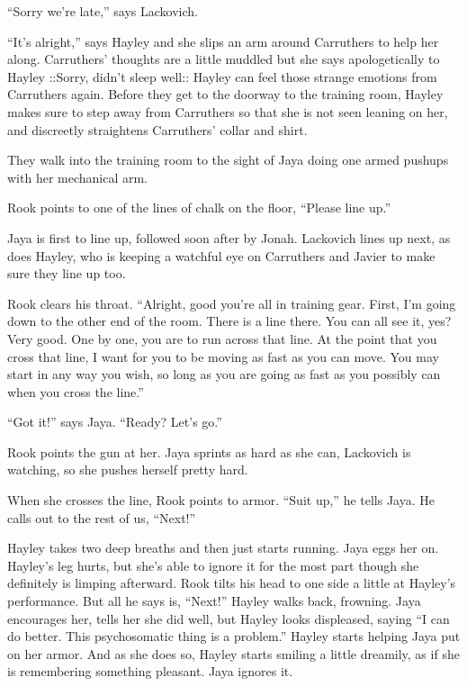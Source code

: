 ``Sorry we're late,'' says Lackovich.

``It's alright,'' says Hayley and she slips an arm around Carruthers to help her along.  Carruthers' thoughts are a little muddled but she says apologetically to Hayley  {\color[RGB]{153,0,255}::Sorry, didn't sleep well::}   Hayley can feel those strange emotions from Carruthers again.   Before they get to the doorway to the training room, Hayley makes sure to step away from Carruthers so that she is not seen leaning on her, and discreetly straightens Carruthers' collar and shirt.



They walk into the training room to the sight of Jaya doing one armed pushups with her mechanical arm. 

Rook points to one of the lines of chalk on the floor, ``Please line up.''

Jaya is first to line up, followed soon after by Jonah.  Lackovich lines up next, as does Hayley, who is keeping a watchful eye on Carruthers and Javier to make sure they line up too.

Rook clears his throat.  ``Alright, good you're all in training gear.  First, I'm going down to the other end of the room. There is a line there.  You can all see it, yes?  Very good.  One by one, you are to run across that line.  At the point that you cross that line, I want for you to be moving as fast as you can move.  You may start in any way you wish, so long as you are going as fast as you possibly can when you cross the line.''

``Got it!'' says Jaya.  ``Ready?  Let's go.''

Rook points the gun at her.  Jaya sprints as hard as she can, Lackovich is watching, so she pushes herself pretty hard.

When she crosses the line, Rook points to armor.  ``Suit up,'' he tells Jaya.  He calls out to the rest of us, ``Next!''

Hayley takes two deep breaths and then just starts running.  Jaya eggs her on.  Hayley's leg hurts, but she's able to ignore it for the most part though she definitely is limping afterward.   Rook tilts his head to one side a little at Hayley's performance.  But all he says is, ``Next!''  Hayley walks back, frowning.  Jaya encourages her, tells her she did well, but Hayley looks displeased, saying ``I can do better.  This psychosomatic thing is a problem.''  Hayley starts helping Jaya put on her armor.  And as she does so, Hayley starts smiling a little dreamily, as if she is remembering something pleasant.  Jaya ignores it.

